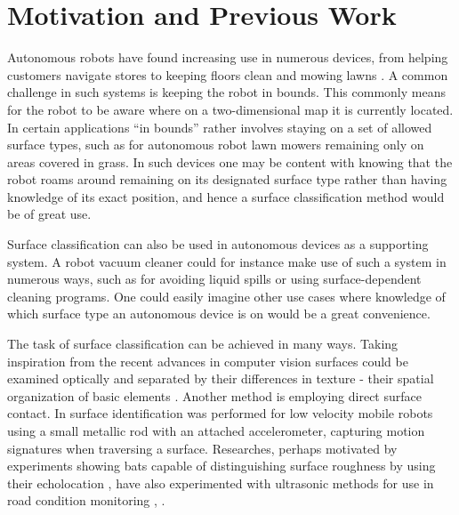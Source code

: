 \section{Motivation and Previous Work}

Autonomous robots have found increasing use in numerous devices, from helping customers navigate stores \citep{mcsweeney_2018} to keeping floors clean \citep{sanfacon_2017} and mowing lawns \citep{udelhofen_2018}. A common challenge in such systems is keeping the robot in bounds. This commonly means for the robot to be aware where on a two-dimensional map it is currently located. In certain applications ``in bounds'' rather involves staying on a set of allowed surface types, such as for autonomous robot lawn mowers remaining only on areas covered in grass. In such devices one may be content with knowing that the robot roams around remaining on its designated surface type rather than having knowledge of its exact position, and hence a surface classification method would be of great use. 

Surface classification can also be used in autonomous devices as a supporting system. A robot vacuum cleaner could for instance make use of such a system in numerous ways, such as for avoiding liquid spills or using surface-dependent cleaning programs. One could easily imagine other use cases where knowledge of which surface type an autonomous device is on would be a great convenience.

The task of surface classification can be achieved in many ways. Taking inspiration from the recent advances in computer vision \citep{liu_chen_fieguth_zhao_chellappa_pietikainen_2018} surfaces could be examined optically and separated by their differences in texture - their spatial organization of basic elements \citep{do_vetterli_2002}. Another method is employing direct surface contact. In \citep{giguere_dudek_2011} surface identification was performed for low velocity mobile robots using a small metallic rod with an attached accelerometer, capturing motion signatures when traversing a surface. Researches, perhaps motivated by experiments showing bats capable of distinguishing surface roughness by using their echolocation \citep{schmidt_1988}, have also experimented with ultrasonic methods for use in road condition monitoring \citep{bystrov_2016}, \citep{mckerrow_kristiansen_2006}. 

